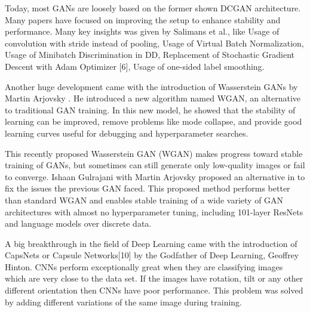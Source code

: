 Today, most GANs are loosely based on the former shown DCGAN \cite{dcgan} architecture. Many papers have focused on improving the setup to enhance stability and performance. Many key insights was given by Salimans et al.\cite{improvedgan}, like Usage of convolution with stride instead of pooling, Usage of Virtual Batch Normalization, Usage of Minibatch Discrimination in DD, Replacement of Stochastic Gradient Descent with Adam Optimizer [6], Usage of one-sided label smoothing.
\par\bigskip

Another huge development came with the introduction of Wasserstein GANs by Martin Arjovsky \cite{wgan} . He introduced a new algorithm named WGAN, an alternative to traditional GAN training. In this new model, he showed that the stability of learning can be improved, remove problems like mode collapse, and provide good learning curves useful for debugging and hyperparameter searches.
\par\bigskip

This recently proposed Wasserstein GAN (WGAN) \cite{wgan} makes progress toward stable training of GANs, but sometimes can still generate only low-quality images or fail to converge. 
Ishaan Gulrajani with Martin Arjovsky proposed an alternative in \cite{improvedwgan} to fix the issues the previous GAN faced. This proposed method performs better than standard WGAN and enables stable training of a wide variety of GAN architectures with almost no hyperparameter tuning, including 101-layer ResNets\cite{deepresidual} and language models over discrete data.
\par\bigskip

A big breakthrough in the field of Deep Learning came with the introduction of CapsNets or Capsule Networks[10] by the Godfather of Deep Learning, Geoffrey Hinton. CNNs perform exceptionally great when they are classifying images which are very close to the data set. If the images have rotation, tilt or any other different orientation then CNNs have poor performance. This problem was solved by adding different variations of the same image during training.
\par\bigskip